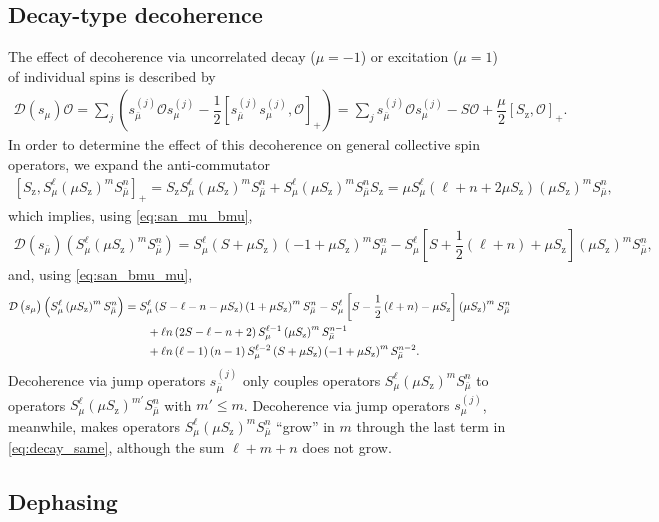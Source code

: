 \documentclass[pra,twocolumn,longbibliography]{revtex4-2}
\newcommand{\f}[2]{\dfrac{#1}{#2}} %
\newcommand{\p}[1]{\left( #1 \right)} %
\renewcommand{\sp}[1]{\left[ #1 \right]} %
\newcommand{\D}{\mathcal{D}}
\renewcommand{\O}{\mathcal{O}}
\newcommand{\z}{\text{z}}
\newcommand{\bmu}{{\bar\mu}}
\newcommand{\1}{\mathds{1}}
\begin{document}
\subsection{Decay-type decoherence}
\label{sec:decay_single}

The effect of decoherence via uncorrelated decay ($\mu=-1$) or
excitation ($\mu=1$) of individual spins is described by
\begin{align}
  \D\p{s_\mu} \O
  = \sum_j\p{s_\bmu^{(j)} \O s_\mu^{(j)}
    - \f12\sp{s_\bmu^{(j)} s_\mu^{(j)},\O}_+}
  = \sum_j s_\bmu^{(j)} \O s_\mu^{(j)}
  - S \O + \f{\mu}{2} \sp{S_\z, \O}_+.
\end{align}
In order to determine the effect of this decoherence on general
collective spin operators, we expand the anti-commutator
\begin{align}
  \sp{S_\z, S_\mu^\ell \p{\mu S_\z}^m S_\bmu^n}_+
  = S_\z S_\mu^\ell \p{\mu S_\z}^m S_\bmu^n
  + S_\mu^\ell \p{\mu S_\z}^m S_\bmu^n S_\z
  = \mu S_\mu^\ell\p{\ell+n+2\mu S_\z} \p{\mu S_\z}^m S_\bmu^n,
\end{align}
which implies, using \eqref{eq:san_mu_bmu},
\begin{align}
  \D\p{s_\bmu} \p{S_\mu^\ell \p{\mu S_\z}^m S_\bmu^n}
  = S_\mu^\ell \p{S+\mu S_\z}\p{-1+\mu S_\z}^m S_\bmu^n
  - S_\mu^\ell\sp{S + \f12\p{\ell+n} + \mu S_\z}
  \p{\mu S_\z}^m S_\bmu^n,
  \label{eq:decay_diff}
\end{align}
and, using \eqref{eq:san_bmu_mu},
\begin{align}
  \D\p{s_\mu} \p{S_\mu^\ell \p{\mu S_\z}^m S_\bmu^n}
  &= S_\mu^\ell \p{S - \ell - n - \mu S_\z} \p{1+\mu S_\z}^m S_\bmu^n
  - S_\mu^\ell\sp{S - \f12\p{\ell+n} - \mu S_\z}
  \p{\mu S_\z}^m S_\bmu^n \notag \\
  &\qquad + \ell n \p{2S - \ell - n + 2}
  S_\mu^{\ell-1} \p{\mu S_\z}^m S_\bmu^{n-1} \notag \\
  &\qquad + \ell n \p{\ell-1} \p{n-1} S_\mu^{\ell-2} \p{S + \mu S_\z}
  \p{-1+\mu S_\z}^m S_\bmu^{n-2}.
  \label{eq:decay_same}
\end{align}
Decoherence via jump operators $s_\bmu^{(j)}$ only couples operators
$S_\mu^\ell \p{\mu S_\z}^m S_\bmu^n$ to operators
$S_\mu^\ell \p{\mu S_\z}^{m'} S_\bmu^n$ with $m'\le m$.  Decoherence
via jump operators $s_\mu^{(j)}$, meanwhile, makes operators
$S_\mu^\ell \p{\mu S_\z}^m S_\bmu^n$ ``grow'' in $m$ through the last
term in \eqref{eq:decay_same}, although the sum $\ell+m+n$ does not
grow.


\subsection{Dephasing}
\label{sec:dephasing_single}
\end{document}
